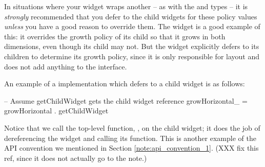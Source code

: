 In situations where your widget wraps another -- as with the 
and  types -- it is \textit{strongly} recommended that
you defer to the child widgets for these policy values \textit{unless}
you have a good reason to override them.  The  widget is
a good example of this: it overrides the growth policy of its child so
that it grows in both dimensions, even though its child may not.  But
the  widget explicitly defers to its children to determine its
growth policy, since it is only responsible for layout and does not
add anything to the interface.

An example of a  implementation which defers to a
child widget is as follows:

\begin{haskellcode}
 -- Assume getChildWidget gets the child widget reference
 growHorizontal_ = growHorizontal . getChildWidget
\end{haskellcode}

Notice that we call the top-level function, , on
the child widget; it does the job of dereferencing the widget and
calling its  function.  This is another example
of the API convention we mentioned in Section
\ref{note:api_convention_1}. (XXX fix this ref, since it does not
actually go to the note.)
